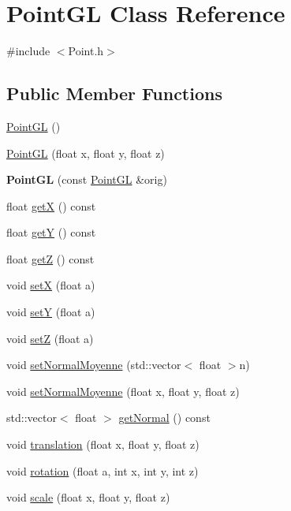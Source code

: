 \hypertarget{classPointGL}{\section{Point\-G\-L Class Reference}
\label{classPointGL}
}


{\ttfamily \#include $<$Point.\-h$>$}

\subsection*{Public Member Functions}
\begin{DoxyCompactItemize}
\item 
\hyperlink{classPointGL_a24e4ffa65772815aa20753e0bc786172}{Point\-G\-L} ()
\item 
\hyperlink{classPointGL_a7c78587e20818ba1cf6101d84c209f30}{Point\-G\-L} (float x, float y, float z)
\item 
\hypertarget{classPointGL_ad43d1643664e6e534a5e254628c1c9c9}{{\bfseries Point\-G\-L} (const \hyperlink{classPointGL}{Point\-G\-L} \&orig)}\label{classPointGL_ad43d1643664e6e534a5e254628c1c9c9}

\item 
float \hyperlink{classPointGL_adb7aa72a985bdd393e896a1414826cc4}{get\-X} () const 
\item 
float \hyperlink{classPointGL_a6808f21ba18339ebcb7ed085748a0ab2}{get\-Y} () const 
\item 
float \hyperlink{classPointGL_a6ca34827d4db24440f77695916952035}{get\-Z} () const 
\item 
void \hyperlink{classPointGL_af3a2a263da2b88f6878b9129ed3c89dd}{set\-X} (float a)
\item 
void \hyperlink{classPointGL_a9db09a7eea4bd0b1c674477d17c57ca8}{set\-Y} (float a)
\item 
void \hyperlink{classPointGL_ae9fee8c6d9bf2c9de0edaaee1cb1c210}{set\-Z} (float a)
\item 
void \hyperlink{classPointGL_a6997b9b1af305d3826e02a3809b1dead}{set\-Normal\-Moyenne} (std\-::vector$<$ float $>$n)
\item 
void \hyperlink{classPointGL_a62e96c2dfcd8a8b8c393b6306dff76cc}{set\-Normal\-Moyenne} (float x, float y, float z)
\item 
std\-::vector$<$ float $>$ \hyperlink{classPointGL_a93f7846dd282e0352349c2905ccbf6f3}{get\-Normal} () const 
\item 
void \hyperlink{classPointGL_aba253aa08f7f222d5d7355191875bc35}{translation} (float x, float y, float z)
\item 
void \hyperlink{classPointGL_ae50ee0f316b8b1e292f47c3c4e8460fa}{rotation} (float a, int x, int y, int z)
\item 
void \hyperlink{classPointGL_a2a664d07bcb24bebaeca3e9ac3d5586f}{scale} (float x, float y, float z)
\end{DoxyCompactItemize}


